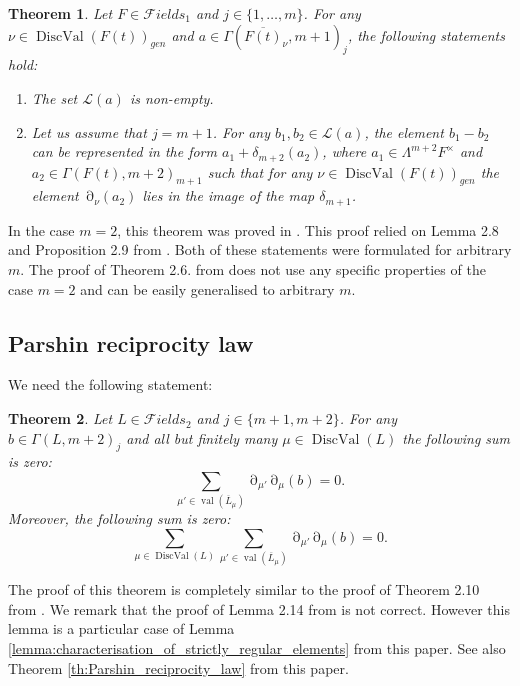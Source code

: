 \documentclass[12pt]{extarticle}
\newtheorem{theorem}{Theorem}[section]
\def\mc{\mathcal}
\def\oL{\ol L}
\def\t{\times}
\def\ol{\overline}
\def\F{{\mc Fields}}
\DeclareMathOperator{\ts}{\partial}
\DeclareMathOperator{\val}{val}
\DeclareMathOperator{\dval}{DiscVal}
\begin{document}
\begin{theorem}
\label{th:main_exact_sequence}
Let $F\in \F_1$ and $j\in\{1,\dots, m\}$. For any $\nu\in \dval(F(t))_{gen}$ and $a\in \Gamma(\ol{F(t)}_\nu, m+1)_j$, the following statements hold:
\begin{enumerate}
    \item  The set $\mathcal L(a)$ is non-empty.
    \item Let us assume that $j=m+1$. For any $b_1,b_2\in \mathcal L(a)$, the element $b_1-b_2$ can be represented in the form $a_1+\delta_{m+2}(a_2)$, where $a_1\in \Lambda^{m+2} F^\t$ and $a_2\in \Gamma(F(t),m+2)_{m+1}$ such that for any $\nu\in\dval(F(t))_{gen}$ the element $\ts_\nu(a_2)$ lies in the image of the map $\delta_{m+1}$.
\end{enumerate}
\end{theorem}

In the case $m=2$, this theorem was proved in \cite[Theorem 2.6]{bolbachan_2023_chow}. This proof relied on Lemma 2.8 and Proposition 2.9 from \cite{bolbachan_2023_chow}. Both of these statements were formulated for arbitrary $m$. The proof of Theorem 2.6. from \cite{bolbachan_2023_chow} does not use any specific properties of the case $m=2$ and can be easily generalised to arbitrary $m$.

\subsection{Parshin reciprocity law}
\label{sec:prel_results:Parshin}

We need the following statement:

\begin{theorem}
\label{th:Parshin_sum_point_curve}
Let $L\in\F_2$ and $j\in\{m+1, m+2\}$. For any $b\in \Gamma(L,m+2)_j$ and all but finitely many $\mu\in \dval(L)$ the following sum is zero:
$$\sum\limits_{\mu'\in \val(\ol L_\mu)}\ts_{\mu'}\ts_\mu(b)=0.$$
Moreover, the following sum is zero:
$$\sum\limits_{\mu\in \dval(L)}\sum\limits_{\mu'\in \val(\oL_\mu)}\ts_{\mu'}\ts_\mu(b)=0.$$
\end{theorem}

The proof of this theorem is completely similar to the proof of Theorem 2.10 from \cite{bolbachan_2023_chow}. We remark that the proof of Lemma 2.14 from \cite{bolbachan_2023_chow} is not correct. However this lemma is a particular case of Lemma \ref{lemma:characterisation_of_strictly_regular_elements} from this paper.  See also Theorem \ref{th:Parshin_reciprocity_law} from this paper. 
\end{document}
